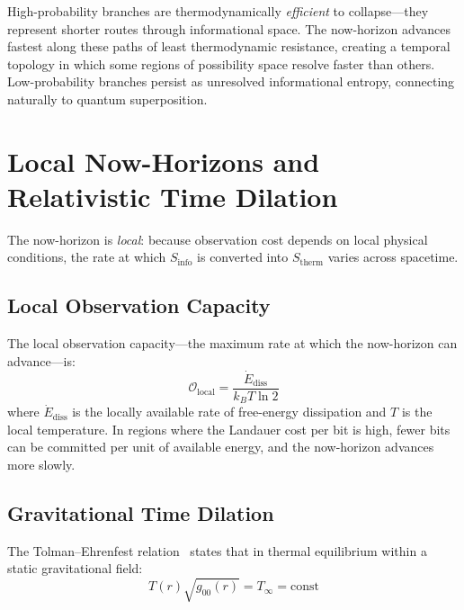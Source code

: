 \documentclass[12pt,a4paper]{article}
\begin{document}
High-probability branches are thermodynamically \emph{efficient} to collapse---they represent shorter routes through informational space. The now-horizon advances fastest along these paths of least thermodynamic resistance, creating a temporal topology in which some regions of possibility space resolve faster than others. Low-probability branches persist as unresolved informational entropy, connecting naturally to quantum superposition.

\section{Local Now-Horizons and Relativistic Time Dilation}
\label{sec:relativity}

The now-horizon is \emph{local}: because observation cost depends on local physical conditions, the rate at which $S_{\mathrm{info}}$ is converted into $S_{\mathrm{therm}}$ varies across spacetime.

\subsection{Local Observation Capacity}

The local observation capacity---the maximum rate at which the now-horizon can advance---is:
\begin{equation}
    \mathcal{O}_{\mathrm{local}} = \frac{\dot{E}_{\mathrm{diss}}}{k_B T \ln 2}
    \label{eq:obs_capacity}
\end{equation}
where $\dot{E}_{\mathrm{diss}}$ is the locally available rate of free-energy dissipation and $T$ is the local temperature. In regions where the Landauer cost per bit is high, fewer bits can be committed per unit of available energy, and the now-horizon advances more slowly.

\subsection{Gravitational Time Dilation}
\label{sec:grav_dilation}

The Tolman--Ehrenfest relation~\cite{Tolman1930} states that in thermal equilibrium within a static gravitational field:
\begin{equation}
    T(r) \sqrt{g_{00}(r)} = T_\infty = \text{const}
\end{equation}
\end{document}
